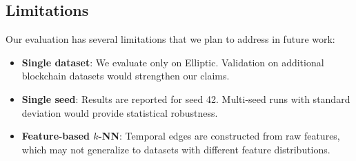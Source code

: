 \subsection{Limitations}

Our evaluation has several limitations that we plan to address in future work:

\begin{itemize}
    \item \textbf{Single dataset}: We evaluate only on Elliptic. Validation on additional blockchain datasets would strengthen our claims.
    \item \textbf{Single seed}: Results are reported for seed 42. Multi-seed runs with standard deviation would provide statistical robustness.
    \item \textbf{Feature-based $k$-NN}: Temporal edges are constructed from raw features, which may not generalize to datasets with different feature distributions.
\end{itemize}

